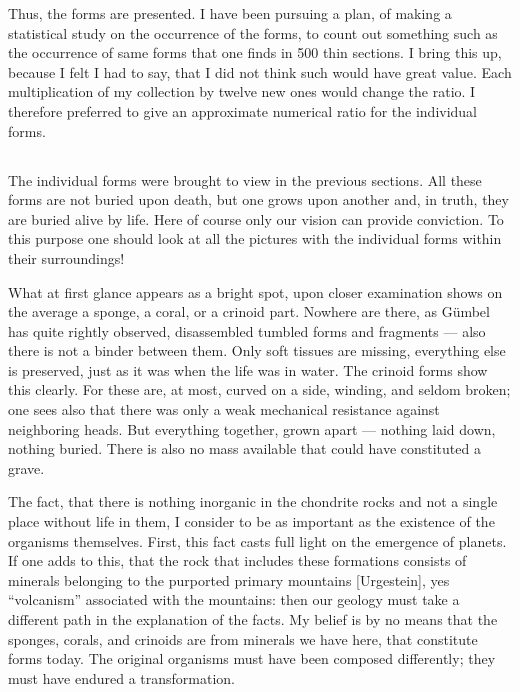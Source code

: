 \documentclass[a4paper, 12pt, oneside]{article}
\begin{document}
Thus, the forms are presented. I have been pursuing a plan, of making a statistical study on the occurrence of the forms, to count out something such as the occurrence of same forms that one finds in 500 thin sections. I bring this up, because I felt I had to say, that I did not think such would have great value. Each multiplication of my collection by twelve new ones would change the ratio. I therefore preferred to give an approximate numerical ratio for the individual forms.
\clearpage
\subsection{}
\paragraph*{}
The individual forms were brought to view in the previous sections. All these forms are not buried upon death, but one grows upon another and, in truth, they are buried alive by life. Here of course only our vision can provide conviction. To this purpose one should look at all the pictures with the individual forms within their surroundings!

What at first glance appears as a bright spot, upon closer examination shows on the average a sponge, a coral, or a crinoid part. Nowhere are there, as Gümbel has quite rightly observed, disassembled tumbled forms and fragments --- also there is not a binder between them. Only soft tissues are missing, everything else is preserved, just as it was when the life was in water. The crinoid forms show this clearly. For these are, at most, curved on a side, winding, and seldom broken; one sees also that there was only a weak mechanical resistance against neighboring heads. But everything together, grown apart --- nothing laid down, nothing buried. There is also no mass available that could have constituted a grave.

The fact, that there is nothing inorganic in the chondrite rocks and not a single place without life in them, I consider to be as important as the existence of the organisms themselves. First, this fact casts full light on the emergence of planets. If one adds to this, that the rock that includes these formations consists of minerals belonging to the purported primary mountains [Urgestein], yes ``volcanism'' associated with the mountains: then our geology must take a different path in the explanation of the facts. My belief is by no means that the sponges, corals, and crinoids are from minerals we have here, that constitute forms today. The original organisms must have been composed differently; they must have endured a transformation.
\end{document}
